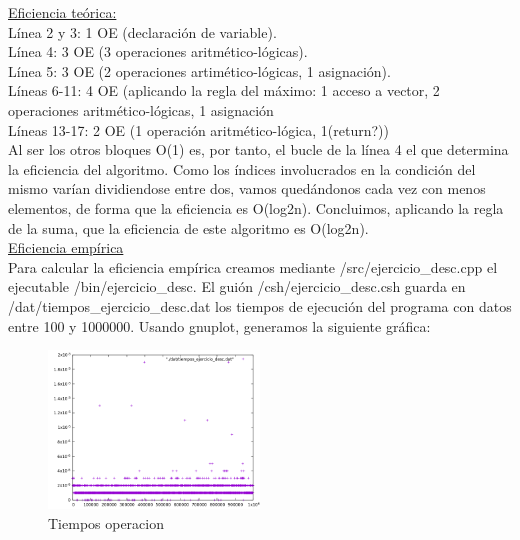 \documentclass[titlepage, 12pt,a4paper]{article}
\begin{document}
	\underline{Eficiencia teórica:} \\
	Línea 2 y 3: 1 OE (declaración de variable).\\
	Línea 4: 3 OE (3 operaciones aritmético-lógicas).\\
	Línea 5: 3 OE (2 operaciones artimético-lógicas, 1 asignación).\\
	Líneas 6-11: 4 OE (aplicando la regla del máximo: 1 acceso a vector, 2 operaciones aritmético-lógicas, 1 asignación\\
	Líneas 13-17: 2 OE (1 operación aritmético-lógica, 1(return?))\\

	Al ser los otros bloques O(1) es, por tanto, el bucle de la línea 4 el que determina la eficiencia del algoritmo. Como los índices involucrados en la condición del mismo varían dividiendose entre dos, vamos quedándonos cada vez con menos elementos, de forma que la eficiencia es O(log2n). Concluimos, aplicando la regla de la suma, que la eficiencia de este algoritmo es O(log2n).\\
	
	\underline{Eficiencia empírica} \\
	Para calcular la eficiencia empírica creamos mediante /src/ejercicio\_desc.cpp el ejecutable /bin/ejercicio\_desc. El guión /csh/ejercicio\_desc.csh guarda en /dat/tiempos\_ejercicio\_desc.dat los tiempos de ejecución del programa con datos entre 100 y 1000000. Usando gnuplot, generamos la siguiente gráfica:
	
	\begin{figure}[!ht]
  \caption{Tiempos operacion}
  \centering
    \includegraphics[width=0.5\textwidth]{./img/ef_pract_ej_3.png}
\end{figure}
	
\end{document}

